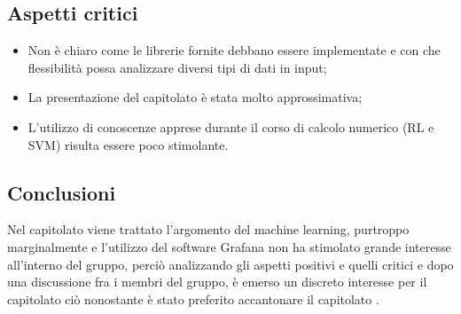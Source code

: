\subsection{Aspetti critici}
\begin{itemize}
\item Non è chiaro come le librerie fornite debbano essere implementate e con che flessibilità possa analizzare diversi tipi di dati in input;
\item La presentazione del capitolato è stata molto approssimativa;
\item L'utilizzo di conoscenze apprese durante il corso di calcolo numerico (RL e SVM) risulta essere poco stimolante.

\end{itemize}
\subsection{Conclusioni}
Nel capitolato viene trattato l'argomento del machine learning,  purtroppo marginalmente e l'utilizzo del software Grafana non ha stimolato grande interesse all'interno del gruppo, perciò analizzando gli aspetti positivi e quelli critici e dopo una discussione fra i membri del gruppo, \`e emerso un discreto interesse per il capitolato ci\`o nonostante \`e stato preferito accantonare il capitolato .